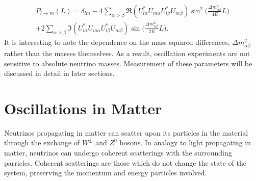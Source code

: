 \begin{equation}\begin{split}\label{oscProbL}
P_{l\rightarrow m}(L) =  \delta_{lm} - 4  \sum_{\alpha > \beta}  \Re(U^*_{l\alpha}U_{m\alpha}U^*_{l\beta}U_{m\beta}) \sin^2 \bigg(\frac{\Delta m_{\alpha\beta}^2}{4E} L\bigg) \\
 + 2  \sum_{\alpha>\beta}  \Im(U^*_{l\alpha}U_{m\alpha}U^*_{l\beta}U_{m\beta}) \sin\bigg(\frac{\Delta m_{\alpha\beta}^2}{2E}L\bigg).
\end{split}\end{equation}
It is interesting to note the dependence on the mass squared differences, $\Delta m^2_{\alpha\beta}$ rather than the masses themselves.  As a result, oscillation experiments are not sensitive to absolute neutrino masses.  Measurement of these parameters will be discussed in detail in later sections.  

\section{Oscillations in Matter}\label{matOsc}

Neutrinos propagating in matter can scatter upon its particles in the material through the exchange of $W^\pm$ and $Z^0$ bosons.  In analogy to light propagating in matter, neutrinos can undergo coherent scatterings with the surrounding parricles.  Coherent scatterings are those which do not change the state of the system, preserving the momentum and energy particles involved.  

